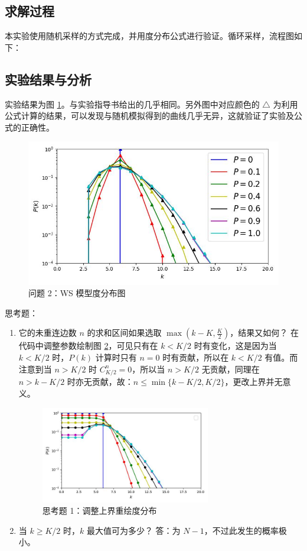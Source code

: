 \documentclass{article}
\begin{document}
\subsection{求解过程}

本实验使用随机采样的方式完成，并用度分布公式进行验证。循环采样，流程图如下：
\begin{center}
\end{center}

\subsection{实验结果与分析}

实验结果为图 \ref{fig:task2}。与实验指导书给出的几乎相同。另外图中对应颜色的 $\triangle$ 为利用公式计算的结果，可以发现与随机模拟得到的曲线几乎无异，这就验证了实验及公式的正确性。
\begin{figure}[ht]
    \label{fig:task2}
    \centering
    \includegraphics[width=.7\textwidth]{../task2.jpg}
    \caption{问题 2：WS 模型度分布图}
\end{figure}

思考题：
\begin{enumerate}
    \item 它的未重连边数 $n$ 的求和区间如果选取 $\max(k-K,\frac{K}{2})$，结果又如何？
    在代码中调整参数绘制图 \ref{fig:task2_fake}，可见只有在 $k<K/2$ 时有变化，这是因为当 $k<K/2$ 时，$P(k)$ 计算时只有 $n=0$ 时有贡献，所以在 $k<K/2$ 有值。而注意到当 $n>K/2$ 时 $C_{K/2}^{n}=0$，所以当 $n>K/2$ 无贡献，同理在 $n>k-K/2$ 时亦无贡献，故：$n\leq\min\{k-K/2,K/2\}$，更改上界并无意义。
    \begin{figure}[ht]
        \label{fig:task2_fake}
        \centering
        \includegraphics[width=0.7\textwidth]{../task2_fake.jpg}
        \caption{思考题 1：调整上界重绘度分布}
    \end{figure}
    \item 当 $k\geq K/2$ 时，$k$ 最大值可为多少？
    答：为 $N-1$，不过此发生的概率极小。
\end{enumerate}
\end{document}
